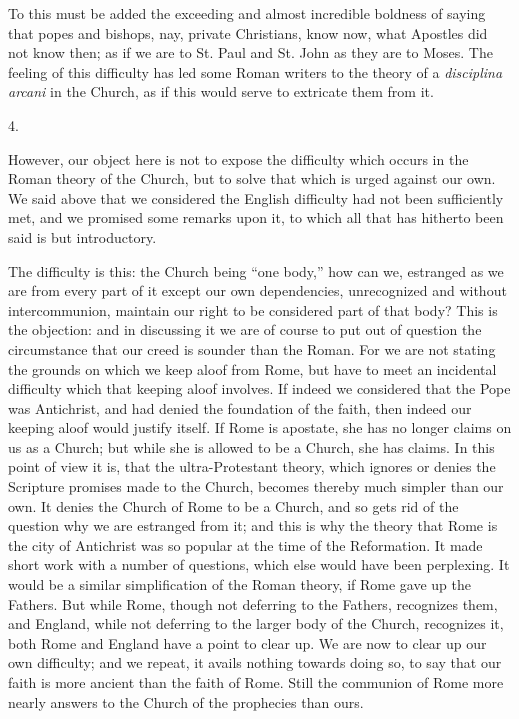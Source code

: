 To this must be added the exceeding and almost
incredible boldness of saying that popes and bishops, nay, private
Christians, know now, what Apostles did not know then; as if we are to
St. Paul and St. John as they are to Moses. The feeling of this
difficulty has led some Roman writers to the theory of a \emph{disciplina
arcani} in the Church, as if this would serve to extricate them
from it.

4.

However, our object here is not to expose the
difficulty which occurs in the Roman theory of the Church, but to
solve that which is urged against our own. We said above that we
considered the English difficulty had not been sufficiently met, and
we promised some remarks upon it, to which all that has hitherto been
said is but introductory.

The difficulty is this: the Church being ``one
body,'' how can we, estranged as we are from every part of it except
our own dependencies, unrecognized and without intercommunion,
maintain our right to be considered part of that body? This is the
objection: and in discussing it we are of course to put out of
question the circumstance that our creed is sounder than the Roman.
For we are not stating the grounds on which we keep aloof from Rome,
but have to meet an incidental difficulty which that keeping aloof
involves. If indeed we considered that the Pope was Antichrist, and
had denied the foundation of the faith, then indeed our keeping aloof
would justify itself. If Rome is apostate, she has no longer claims on
us as a Church; but while she is allowed to be a Church, she has
claims. In this point of view it is, that the ultra-Protestant
theory, which ignores or denies the Scripture promises made to the
Church, becomes thereby much simpler than our own. It denies the
Church of Rome to be a Church, and so gets rid of the question why we
are estranged from it; and this is why the theory that Rome is the
city of Antichrist was so popular at the time of the Reformation. It
made short work with a number of questions, which else would have been
perplexing. It would be a similar simplification of the Roman theory,
if Rome gave up the Fathers. But while Rome, though not deferring to
the Fathers, recognizes them, and England, while not deferring to the
larger body of the Church, recognizes it, both Rome and England have a
point to clear up. We are now to clear up our own difficulty; and we
repeat, it avails nothing towards doing so, to say that our faith is
more ancient than the faith of Rome. Still the communion of Rome more
nearly answers to the Church of the prophecies than ours.

